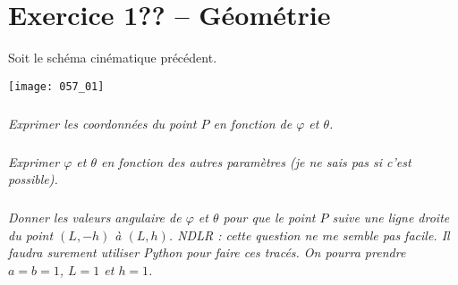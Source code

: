 \section*{Exercice 1?? -- Géométrie}

\setcounter{exo}{0}
Soit le schéma cinématique précédent. 
\begin{center}
\texttt{[image: 057\_01]}
\end{center}



\subparagraph{}
\textit{Exprimer les coordonnées du point $P$ en fonction de $\varphi$ et $\theta$.}
\ifprof
\begin{corrige}

\end{corrige}
\else
\fi



\subparagraph{}
\textit{Exprimer $\varphi$ et $\theta$ en fonction des autres paramètres (je ne sais pas si c'est possible).}
\ifprof
\begin{corrige}

\end{corrige}
\else
\fi


\subparagraph{}
\textit{Donner les valeurs angulaire de $\varphi$ et $\theta$ pour que le point $P$ suive une ligne droite du point $(L,-h)$ à $(L,h)$. NDLR : cette question ne me semble pas facile. Il faudra surement utiliser Python pour faire ces tracés. On pourra prendre $a=b=1$, $L=1$ et $h=1$.}
\ifprof
\begin{corrige}
\end{corrige}
\else
\fi
